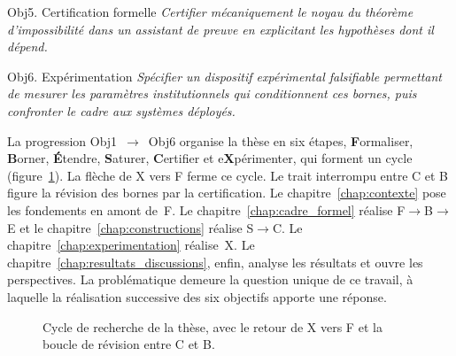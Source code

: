 \begin{sloppypar}
\medskip
\begin{boiteQuestion}{Obj5. Certification formelle}
\textit{Certifier m\'ecaniquement le noyau du th\'eor\`eme d'impossibilit\'e dans un assistant de preuve en explicitant les hypoth\`eses dont il d\'epend.}
\end{boiteQuestion}


\medskip
\begin{boiteQuestion}{Obj6. Exp\'erimentation}
\textit{Sp\'ecifier un dispositif exp\'erimental falsifiable permettant de mesurer les param\`etres institutionnels qui conditionnent ces bornes, puis confronter le cadre aux syst\`emes d\'eploy\'es.}
\end{boiteQuestion}

\medskip
\label{par:progression_FBESCX}
La progression Obj1~$\to$~Obj6 organise la th\`ese en six \'etapes, \textbf{F}ormaliser,
\textbf{B}orner, \textbf{\'E}tendre, \textbf{S}aturer, \textbf{C}ertifier et
e\textbf{X}p\'erimenter, qui forment un cycle (figure~\ref{fig:cycle_recherche}). La fl\`eche de X vers F ferme ce cycle. Le trait interrompu entre C et B figure la r\'evision des bornes par la certification. Le chapitre~\ref{chap:contexte} pose les fondements en amont de~F.
Le chapitre~\ref{chap:cadre_formel} r\'ealise F$\to$B$\to$E et le
chapitre~\ref{chap:constructions} r\'ealise S$\to$C. Le
chapitre~\ref{chap:experimentation} r\'ealise~X. Le
chapitre~\ref{chap:resultats_discussions}, enfin, analyse les r\'esultats et ouvre les perspectives.
La probl\'ematique demeure la question unique de ce travail, \`a laquelle la r\'ealisation
successive des six objectifs apporte une r\'eponse.

\end{sloppypar}

\begin{figure}[H]
\centering
{}
\caption{Cycle de recherche de la th\`ese, avec le retour de X vers F et la boucle de r\'evision entre C et B.}
\label{fig:cycle_recherche}
\end{figure}

